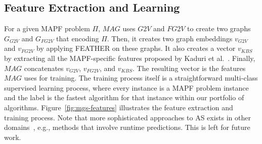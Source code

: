 \documentclass[letterpaper]{article} %
\newcommand{\Omri}[1]{}
\newcommand{\Carmel}[1]{}
\newcommand{\gtv}[1]{\ensuremath{\textit{G2V}}\xspace}
\newcommand{\fgtv}[1]{\ensuremath{\textit{FG2V}}\xspace}
\newcommand{\kaduri}[1]{\ensuremath{\textit{KBS}}\xspace}
\newcommand{\mapfgas}[1]{\ensuremath{\textit{MAG}}\xspace}
\begin{document}
\subsection{Feature Extraction and Learning}


For a given MAPF problem $\Pi$, \mapfgas\ uses \gtv\ and \fgtv\ to create two graphs $G_\gtv\ $ and $G_\fgtv\ $ that encoding $\Pi$.
Then, it creates two graph embeddings $v_\gtv\ $ and $v_\fgtv\ $ by applying FEATHER on these graphs.
It also creates a vector $v_\kaduri\ $ by extracting all the MAPF-specific features proposed by Kaduri et al.~\cite{kaduri2020algorithm}.
Finally, \mapfgas\ concatenates
$v_\gtv\ $, $v_\fgtv\ $, and $v_\kaduri\ $.
The resulting vector is the features \mapfgas\ uses for training.
The training process itself is a straightforward multi-class supervised learning process,
where every instance is a MAPF problem instance and the label is the fastest algorithm for that instance within our portfolio of algorithms.
Figure~\ref{fig:mgs-features} illustrates the feature extraction and training process.
Note that more sophisticated approaches to AS exists in other domains~\cite{kerschke2019automated}, e.g., methods that involve runtime predictions. This is left for future work.
\end{document}
